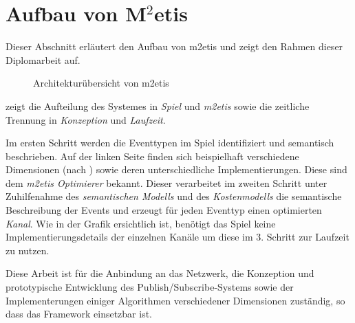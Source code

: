 \section{Aufbau von M$^2$etis}
\label{chap:grundlagen:aufbau_metis}

Dieser Abschnitt erläutert den Aufbau von \ac{m2etis} \cite{Fischer2010a, Fischer2010Event} und zeigt den Rahmen dieser Diplomarbeit auf. 

\begin{figure}[htbp]
\centering
{}
\caption{Architekturübersicht von \ac{m2etis}}
\label{fig:metis_aufbau}
\end{figure}

 zeigt die Aufteilung des Systemes in \emph{Spiel} und \emph{\ac{m2etis}} sowie die zeitliche Trennung in \emph{Konzeption} und \emph{Laufzeit}.

Im ersten Schritt werden die Eventtypen im Spiel identifiziert und semantisch beschrieben. Auf der linken Seite finden sich beispielhaft verschiedene Dimensionen (nach \cite{Fischer2010a}) sowie deren unterschiedliche Implementierungen. Diese sind dem \emph{\ac{m2etis} Optimierer} bekannt. Dieser verarbeitet im zweiten Schritt unter Zuhilfenahme des \emph{semantischen Modells} und des \emph{Kostenmodells} die semantische Beschreibung der Events und erzeugt für jeden Eventtyp einen optimierten \emph{Kanal}. Wie in der Grafik ersichtlich ist, benötigt das Spiel keine  Implementierungsdetails der einzelnen Kanäle um diese im 3. Schritt zur Laufzeit zu nutzen.

Diese Arbeit ist für die Anbindung an das Netzwerk, die Konzeption und prototypische Entwicklung des Publish/Subscribe-Systems sowie der Implementerungen einiger Algorithmen verschiedener Dimensionen zuständig, so dass das Framework einsetzbar ist.
